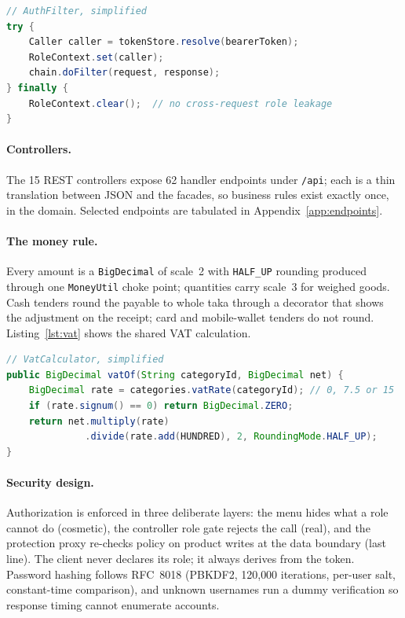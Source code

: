 \documentclass[12pt,a4paper]{report}
\begin{document}
\begin{lstlisting}[language=Java,caption={Request context that never leaks between
requests (simplified).},label={lst:rolecontext}]
// AuthFilter, simplified
try {
    Caller caller = tokenStore.resolve(bearerToken);
    RoleContext.set(caller);
    chain.doFilter(request, response);
} finally {
    RoleContext.clear();  // no cross-request role leakage
}
\end{lstlisting}

\paragraph{Controllers.} The 15 REST controllers expose 62 handler endpoints under
\texttt{/api}; each is a thin translation between JSON and the facades, so business rules
exist exactly once, in the domain. Selected endpoints are tabulated in
Appendix~\ref{app:endpoints}.

\paragraph{The money rule.} Every amount is a \texttt{BigDecimal} of scale~2 with
\texttt{HALF\_UP} rounding produced through one \texttt{MoneyUtil} choke point;
quantities carry scale~3 for weighed goods. Cash tenders round the payable to whole
taka through a decorator that shows the adjustment on the receipt; card and mobile-wallet
tenders do not round. Listing~\ref{lst:vat} shows the shared VAT calculation.

\begin{lstlisting}[language=Java,caption={Inclusive-VAT back-calculation, the single
source of NBR output VAT (simplified).},label={lst:vat}]
// VatCalculator, simplified
public BigDecimal vatOf(String categoryId, BigDecimal net) {
    BigDecimal rate = categories.vatRate(categoryId); // 0, 7.5 or 15
    if (rate.signum() == 0) return BigDecimal.ZERO;
    return net.multiply(rate)
              .divide(rate.add(HUNDRED), 2, RoundingMode.HALF_UP);
}
\end{lstlisting}

\paragraph{Security design.} Authorization is enforced in three deliberate layers: the
menu hides what a role cannot do (cosmetic), the controller role gate rejects the call
(real), and the protection proxy re-checks policy on product writes at the data boundary
(last line). The client never declares its role; it always derives from the token.
Password hashing follows RFC~8018 (PBKDF2, 120{,}000 iterations, per-user salt,
constant-time comparison), and unknown usernames run a dummy verification so response
timing cannot enumerate accounts.
\end{document}
